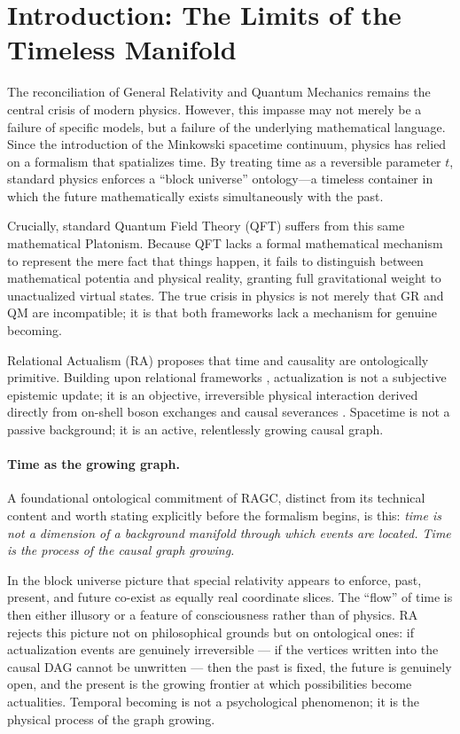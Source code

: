 \documentclass[11pt,a4paper]{article}
\theoremstyle{plain}
\theoremstyle{definition}
\theoremstyle{remark}
\begin{document}
\section{Introduction: The Limits of the Timeless Manifold}

The reconciliation of General Relativity and Quantum Mechanics remains the
central crisis of modern physics. However, this impasse may not merely be a
failure of specific models, but a failure of the underlying mathematical language.
Since the introduction of the Minkowski spacetime continuum, physics has relied
on a formalism that spatializes time. By treating time as a reversible parameter
$t$, standard physics enforces a ``block universe'' ontology---a timeless container
in which the future mathematically exists simultaneously with the past.

Crucially, standard Quantum Field Theory (QFT) suffers from this same mathematical
Platonism. Because QFT lacks a formal mathematical mechanism to represent the mere
fact that things happen, it fails to distinguish between mathematical potentia and
physical reality, granting full gravitational weight to unactualized virtual states.
The true crisis in physics is not merely that GR and QM are incompatible; it is
that both frameworks lack a mechanism for genuine becoming.

Relational Actualism (RA) proposes that time and causality are ontologically
primitive. Building upon relational frameworks \citep{Rovelli1996}, actualization
is not a subjective epistemic update; it is an objective, irreversible physical
interaction derived directly from on-shell boson exchanges and causal
severances \citep{Sandeman2026a}. Spacetime is not a passive background; it is an
active, relentlessly growing causal graph.

\paragraph{Time as the growing graph.}
A foundational ontological commitment of RAGC, distinct from its technical
content and worth stating explicitly before the formalism begins, is this:
\emph{time is not a dimension of a background manifold through which events are
located. Time is the process of the causal graph growing.}

In the block universe picture that special relativity appears to enforce,
past, present, and future co-exist as equally real coordinate slices. The
``flow'' of time is then either illusory or a feature of consciousness rather
than of physics. RA rejects this picture not on philosophical grounds but on
ontological ones: if actualization events are genuinely irreversible --- if the
vertices written into the causal DAG cannot be unwritten --- then the past is
fixed, the future is genuinely open, and the present is the growing frontier at
which possibilities become actualities. Temporal becoming is not a psychological
phenomenon; it is the physical process of the graph growing.
\end{document}
